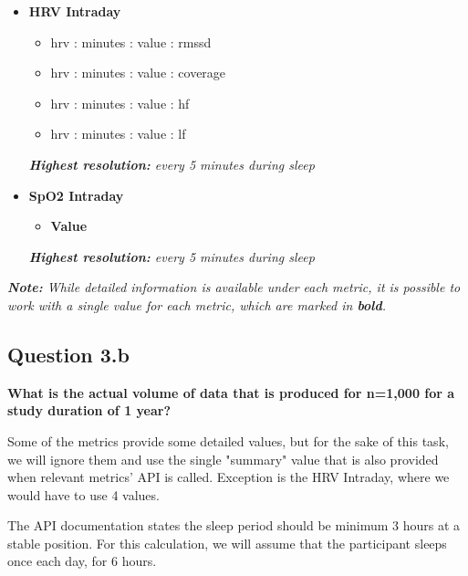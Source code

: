 \documentclass[a4paper, 12pt]{article}
\begin{document}
\begin{itemize}
    \item \textbf{HRV Intraday}
    \begin{itemize}
        \item hrv : minutes : value : rmssd
        \item hrv : minutes : value : coverage
        \item hrv : minutes : value : hf
        \item hrv : minutes : value : lf
    \end{itemize}
    \textit{\textbf{Highest resolution:} every 5 minutes during sleep}

    \item \textbf{SpO2 Intraday}
    \begin{itemize}
        \item \textbf{Value}
    \end{itemize}
    \textit{\textbf{Highest resolution:} every 5 minutes during sleep}
\end{itemize}

\vspace{0.5em}
\textit{\textbf{Note:} While detailed information is available under each metric, it is possible to work with a single value for each metric, which are marked in \textbf{bold}.}

\break

\subsection*{Question 3.b}
\textbf{What is the actual volume of data that is produced for n=1,000 for a study duration of 1 year?}

Some of the metrics provide some detailed values, but for the sake of this task, we will ignore them and use the single "summary" value that is also provided when relevant metrics' API is called.
Exception is the HRV Intraday, where we would have to use 4 values.

The API documentation states the sleep period should be minimum 3 hours at a stable position. For this calculation, we will assume that the participant sleeps once each day, for 6 hours.
\end{document}
